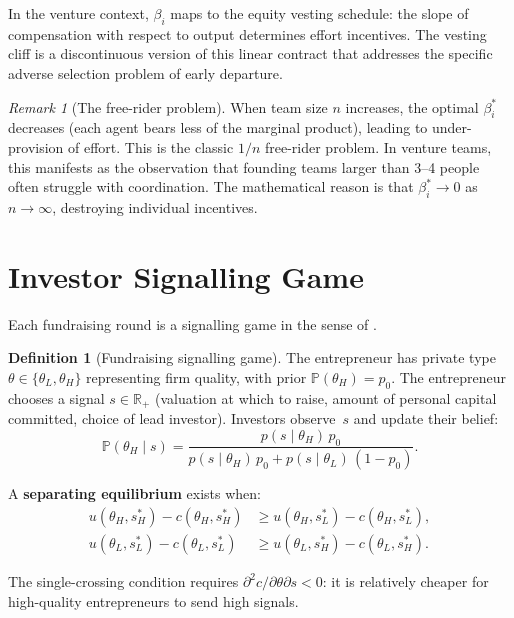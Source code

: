 \documentclass[12pt,a4paper,oneside]{book}
\theoremstyle{definition}
\newtheorem{definition}[theorem]{Definition}
\theoremstyle{remark}
\newtheorem{remark}[theorem]{Remark}
\newcommand{\Prob}{\mathbb{P}}
\newcommand{\R}{\mathbb{R}}
\begin{document}
In the venture context, $\beta_i$ maps to the equity vesting schedule: the slope of
compensation with respect to output determines effort incentives. The vesting cliff
is a discontinuous version of this linear contract that addresses the specific adverse
selection problem of early departure.

\begin{remark}[The free-rider problem]
When team size $n$ increases, the optimal $\beta_i^*$ decreases (each agent bears less
of the marginal product), leading to under-provision of effort. This is the classic
$1/n$ free-rider problem. In venture teams, this manifests as the observation that
founding teams larger than 3--4 people often struggle with coordination. The mathematical
reason is that $\beta_i^* \to 0$ as $n \to \infty$, destroying individual incentives.
\end{remark}

\section{Investor Signalling Game}\label{sec:signalling}

Each fundraising round is a signalling game in the sense of \citet{Spence1973}.

\begin{definition}[Fundraising signalling game]
The entrepreneur has private type $\theta \in \{\theta_L, \theta_H\}$
representing firm quality, with prior $\Prob(\theta_H) = p_0$.
The entrepreneur chooses a signal $s \in \R_+$ (valuation at which to
raise, amount of personal capital committed, choice of lead investor).
Investors observe~$s$ and update their belief:
\begin{equation}\label{eq:bayes_signal}
  \Prob(\theta_H \mid s) = \frac{p(s \mid \theta_H)\,p_0}
    {p(s \mid \theta_H)\,p_0 + p(s \mid \theta_L)\,(1-p_0)}.
\end{equation}
\end{definition}

A \textbf{separating equilibrium} exists when:
\begin{align}
  u(\theta_H, s_H^*) - c(\theta_H, s_H^*)
  &\geq u(\theta_H, s_L^*) - c(\theta_H, s_L^*), \label{eq:separating} \\
  u(\theta_L, s_L^*) - c(\theta_L, s_L^*)
  &\geq u(\theta_L, s_H^*) - c(\theta_L, s_H^*). \label{eq:separating2}
\end{align}

The single-crossing condition requires $\partial^2 c / \partial \theta \partial s < 0$:
it is relatively cheaper for high-quality entrepreneurs to send high signals.
\end{document}
